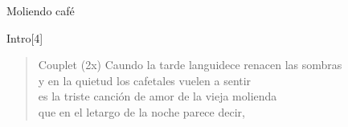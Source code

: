 \begin{song}[tropical]{Moliendo café}



\begin{instrumental}{Intro}[4]
\measure{}
\measure{}\measure{}\measure{}
\measure{$\downarrow$}
\end{instrumental}

\begin{verse}{Couplet (2x)}
Caundo la tarde languidece renacen las sombras\hspace{1.5em}\\
y en la quietud los cafetales vuelen a sentir\\
es la triste canción de amor de la vieja molienda\\
que en el letargo de la noche parece decir,\hspace{1em}\chord{$\downarrow\downarrow$}\hspace{1.5em}\chord{$\downarrow\downarrow$}
\end{verse}


\end{song}
